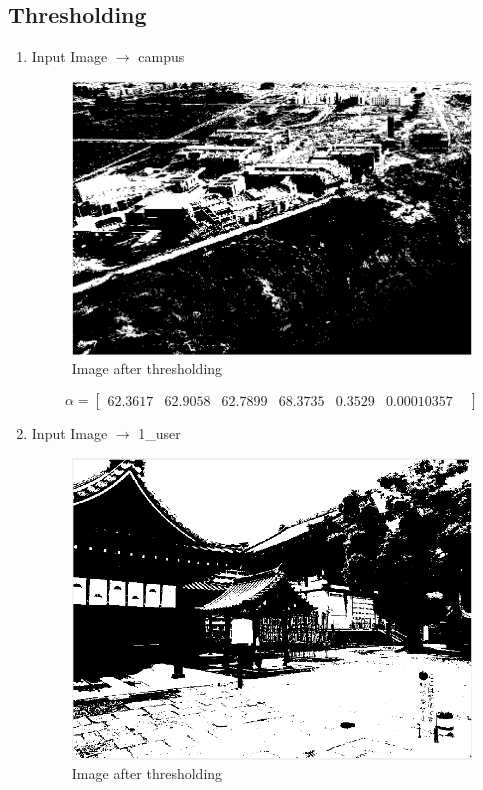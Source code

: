 \documentclass{article}
\begin{document}
\subsection{Thresholding}
\begin{enumerate}
    \item Input Image $\longrightarrow$ campus
    \begin{figure}[H]
        \centering
        \includegraphics[width=0.75\linewidth]{1.png}
        \caption{Image after thresholding}
        \label{fig:Image after thresholding}
    \end{figure}
    \[
    \alpha=
    \begin{bmatrix} 
     62.3617 &
     62.9058 &
     62.7899 &
     68.3735 &
     0.3529 &
     0.00010357 &
    \end{bmatrix}
    \]
    \item Input Image $\longrightarrow$ 1{\_}user
    \begin{figure}[H]
        \centering
        \includegraphics[width=0.75\linewidth]{2.png}
        \caption{Image after thresholding}
        \label{fig:Image after thresholding}
    \end{figure}

\end{enumerate}
\end{document}
